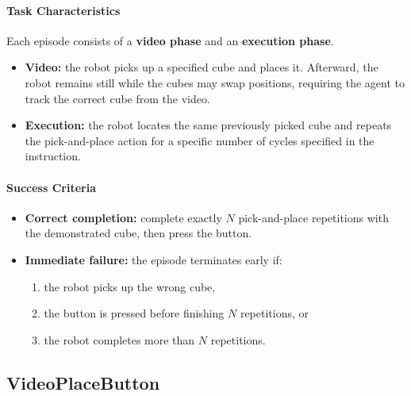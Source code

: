\paragraph{Task Characteristics}
Each episode consists of a \textbf{video phase} and an \textbf{execution phase}.
\begin{itemize}[itemsep=1pt, topsep=0pt, leftmargin=*]
\item \textbf{Video:} the robot picks up a specified cube and places it. Afterward, the robot remains still while the cubes may swap positions, requiring the agent to track the correct cube from the video.
\item \textbf{Execution:} the robot locates the same previously picked cube and repeats the pick-and-place action for a specific number of cycles specified in the instruction.
\end{itemize}

\paragraph{Success Criteria}
\begin{itemize}[itemsep=1pt, topsep=0pt, leftmargin=*]
\item \textbf{Correct completion:} complete exactly $N$ pick-and-place repetitions with the demonstrated cube, then press the button.
\item \textbf{Immediate failure:} the episode terminates early if:
\begin{enumerate}[itemsep=1pt, topsep=0pt, leftmargin=*]
\item the robot picks up the wrong cube,
\item the button is pressed before finishing $N$ repetitions, or
\item the robot completes more than $N$ repetitions.
\end{enumerate}
\end{itemize}

\clearpage


\subsection{VideoPlaceButton}
\label{sec:task_videoplacebutton}


